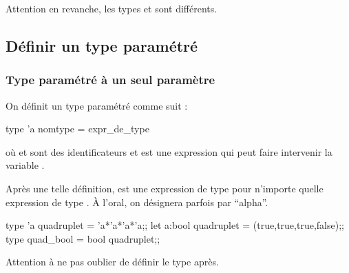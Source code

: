 			\begin{Exemple}
			\end{Exemple}
			
			\begin{Remarque}
				
			\end{Remarque}
		
			\begin{Remarque}
				Attention en revanche, les types  et  sont différents.
			\end{Remarque}
		
	\subsection{Définir un type paramétré}
	
		\subsubsection{Type paramétré à un seul paramètre}
			
			\vs{-2}
			\begin{Syntaxe}
				On définit un type paramétré comme suit : \vs{2}
					\begin{Caml}
						 type 'a nomtype = expr_de_type
					\end{Caml}
				\vs{2}
				où  et  sont des identificateurs et  est une expression qui peut faire intervenir la variable \caml{'a}.
			\end{Syntaxe}
			
			\vs{2}
			Après une telle définition,  est une expression de type pour n'importe quelle expression de type . \`A l'oral, on désignera parfois  par ``alpha''.
			
			\vs{2}
			\begin{Exemple} \vs{-7.5}
				\begin{Caml}
		   type 'a quadruplet = 'a*'a*'a*'a;;
		   let a:bool quadruplet = (true,true,true,false);;
		   type quad_bool = bool quadruplet;;
				\end{Caml}
			\end{Exemple}
		
			\vs{2}
			\begin{Remarque}
				Attention à ne pas oublier de définir le type \caml{'a} après.
			\end{Remarque}
		
